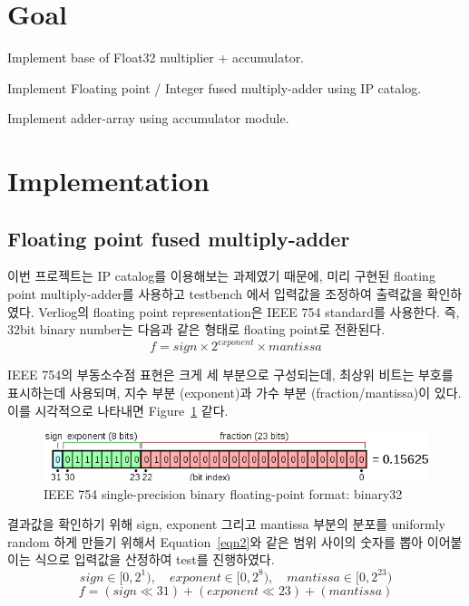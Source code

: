\documentclass{article}
\begin{document}
\pagestyle{fancy}

\section*{Goal}

\begin{itemize*}
\item Implement base of Float32 multiplier + accumulator.
\item Implement Floating point / Integer fused multiply-adder using IP catalog.
\item Implement adder-array using accumulator module.
\end{itemize*}

\section{Implementation}

\subsection{Floating point fused multiply-adder}

이번 프로젝트는 IP catalog를 이용해보는 과제였기 때문에, 미리 구현된 floating point multiply-adder를 사용하고
testbench 에서 입력값을 조정하여 출력값을 확인하였다.
Verliog의 floating point representation은 IEEE 754 standard를 사용한다. 
즉, 32bit binary number는 다음과 같은 형태로 floating point로 전환된다. 
\begin{equation}
	 f = sign \times 2^{exponent} \times mantissa
\label{eqn1}
\end{equation}

IEEE 754의 부동소수점 표현은 크게 세 부분으로 구성되는데, 최상위 비트는 부호를 표시하는데 사용되며, 지수 부분 (exponent)과 가수 부분 (fraction/mantissa)이 있다.
이를 시각적으로 나타내면 Figure~\ref{fig1} 같다.

\begin{figure}[ht]
	\centering
	\includegraphics[width=1.0\textwidth]{fig/fig1.png}
	\caption{IEEE 754 single-precision binary floating-point format: binary32}
\label{fig1}
\end{figure}

결과값을 확인하기 위해 sign, exponent 그리고 mantissa 부분의 분포를 uniformly random 하게 만들기 위해서 Equation~\ref{eqn2}와 같은 범위 사이의 숫자를 뽑아 이어붙이는 식으로 입력값을 산정하여 test를 진행하였다.
\begin{equation}
	 sign \in [0, 2^1), \quad exponent \in [0, 2^8), \quad mantissa \in [0, 2^{23})
\label{eqn2}
\end{equation}
\begin{equation}
	 f = (sign \ll 31) + (exponent  \ll 23) + (mantissa)
\label{eqn3}
\end{equation}
\end{document}
